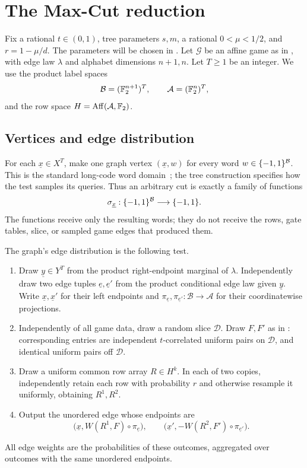 \section{The Max-Cut reduction}\label{sec:reduction}

Fix a rational $t\in(0,1)$, tree parameters $s,m$, a rational
$0<\mu<1/2$, and $r=1-\mu/d$. The parameters will be chosen in
. Let $\mathcal G$ be an affine game as in
, with edge law $\lambda$ and alphabet dimensions
$n+1,n$. Let $T\ge1$ be an integer. We use the product label spaces
\[
 \mathcal B=(\mathbb F_2^{n+1})^T,\qquad
 \mathcal A=(\mathbb F_2^n)^T,
\]
and the row space $H=\operatorname{Aff}(\mathcal A,\mathbb F_2)$.

\subsection{Vertices and edge distribution}

For each $\underline x\in X^T$, make one graph vertex
$(\underline x,w)$ for every word $w\in\{-1,1\}^{\mathcal B}$.
This is the standard long-code word domain~\cite{BGS98,Hastad01};
the tree construction specifies how the test samples its queries.
Thus an arbitrary cut is exactly a family of functions
\[
 \sigma_{\underline x}:\{-1,1\}^{\mathcal B}\longrightarrow\{-1,1\}.
\]
The functions receive only the resulting words; they do not receive the
rows, gate tables, slice, or sampled game edges that produced them.

The graph's edge distribution is the following test.
\begin{enumerate}
\item Draw $\underline y\in Y^T$ from the product right-endpoint marginal
of $\lambda$. Independently draw two edge tuples
$\underline e,\underline e'$ from the product conditional edge law given
$\underline y$. Write $\underline x,\underline x'$ for their left
endpoints and
$\pi_{\underline e},\pi_{\underline e'}:\mathcal B\to\mathcal A$
for their coordinatewise projections.

\item Independently of all game data, draw a random slice $\mathcal D$.
Draw $F,F'$ as in : corresponding entries
are independent $t$-correlated uniform pairs on $\mathcal D$, and
identical uniform pairs off $\mathcal D$.

\item Draw a uniform common row array $R\in H^k$. In each of two copies,
independently retain each row with probability $r$ and otherwise resample
it uniformly, obtaining $R^1,R^2$.

\item Output the unordered edge whose endpoints are
\begin{equation}\label{eq:test-queries}
 \bigl(\underline x,W(R^1,F)\circ\pi_{\underline e}\bigr),
 \qquad
 \bigl(\underline x',-W(R^2,F')\circ\pi_{\underline e'}\bigr).
\end{equation}
\end{enumerate}
All edge weights are the probabilities of these outcomes, aggregated over
outcomes with the same unordered endpoints.

